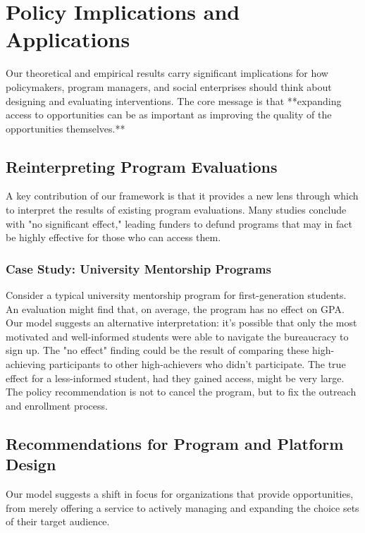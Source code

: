 \section{Policy Implications and Applications}\label{sec:policy}

Our theoretical and empirical results carry significant implications for how policymakers, program managers, and social enterprises should think about designing and evaluating interventions. The core message is that **expanding access to opportunities can be as important as improving the quality of the opportunities themselves.**

\subsection{Reinterpreting Program Evaluations}
A key contribution of our framework is that it provides a new lens through which to interpret the results of existing program evaluations. Many studies conclude with "no significant effect," leading funders to defund programs that may in fact be highly effective for those who can access them.

\subsubsection{Case Study: University Mentorship Programs}
Consider a typical university mentorship program for first-generation students. An evaluation might find that, on average, the program has no effect on GPA. Our model suggests an alternative interpretation: it's possible that only the most motivated and well-informed students were able to navigate the bureaucracy to sign up. The "no effect" finding could be the result of comparing these high-achieving participants to other high-achievers who didn't participate. The true effect for a less-informed student, had they gained access, might be very large. The policy recommendation is not to cancel the program, but to fix the outreach and enrollment process.

\subsection{Recommendations for Program and Platform Design}
Our model suggests a shift in focus for organizations that provide opportunities, from merely offering a service to actively managing and expanding the choice sets of their target audience.

